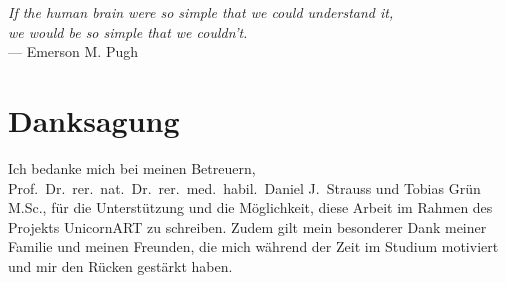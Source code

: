 
\begin{flushright}{\slshape
    If the human brain were so simple that we could understand it, \\
    we would be so simple that we couldn't.} \\ \vspace{\baselineskip}
    --- Emerson M. Pugh
\end{flushright}

\bigskip

\begingroup
	\let\clearpage\relax
	\let\cleardoublepage\relax
	\let\cleardoublepage\relax
	\chapter*{Danksagung}

\noindent Ich bedanke mich bei meinen Betreuern, Prof.\ Dr.\ rer.\ nat.\ Dr.\ rer.\ med.\ habil.\ Daniel J.\ Strauss und Tobias Grün M.Sc., für die Unterstützung und die Möglichkeit, diese Arbeit im Rahmen des Projekts UnicornART zu schreiben.
Zudem gilt mein besonderer Dank meiner Familie und meinen Freunden, die mich während der Zeit im Studium motiviert und mir den Rücken gestärkt haben.
\endgroup


